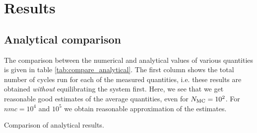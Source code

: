 \section{Results}\label{sec:results}
\subsection{Analytical comparison}\label{subsec_results:analytical}
The comparison between the numerical and analytical values of various quantities is given in table \ref{tab:compare_analytical}. The first column shows the total number of cycles run for each of the measured quantities, i.e. these results are obtained \textit{without} equilibrating the system first. Here, we see that we get reasonable good estimates of the average quantities, even for $N_\mathrm{MC}=10^2$. For $nmc=10^4$ and $10^5$ we obtain reasonable approximation of the estimates.  

\begin{table}[!ht]
    
    \caption{Comparison of analytical results. }
    \label{tab:compare_analytical}
\end{table}


